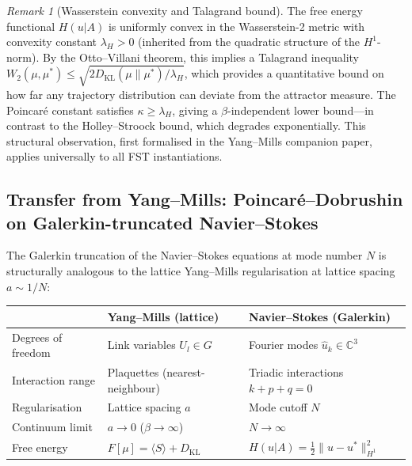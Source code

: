 \documentclass[12pt,a4paper]{article}
\theoremstyle{definition}
\theoremstyle{plain}
\theoremstyle{remark}
\newtheorem{remark}[definition]{Remark}
\begin{document}
\begin{remark}[Wasserstein convexity and Talagrand bound]
\label{rem:talagrand}
The free energy functional $H(u|A)$ is uniformly convex in the Wasserstein-2 metric with convexity constant $\lambda_H > 0$ (inherited from the quadratic structure of the $H^1$-norm). By the Otto--Villani theorem, this implies a Talagrand inequality $W_2(\mu, \mu^*) \leq \sqrt{2 D_{\mathrm{KL}}(\mu \| \mu^*) / \lambda_H}$, which provides a quantitative bound on how far any trajectory distribution can deviate from the attractor measure. The Poincar\'e constant satisfies $\kappa \geq \lambda_H$, giving a $\beta$-independent lower bound---in contrast to the Holley--Stroock bound, which degrades exponentially. This structural observation, first formalised in the Yang--Mills companion paper, applies universally to all FST instantiations.
\end{remark}

\subsection{Transfer from Yang--Mills: Poincar\'e--Dobrushin on Galerkin-truncated Navier--Stokes}
\label{sec:ym-ns-transfer}

The Galerkin truncation of the Navier--Stokes equations at mode number $N$ is structurally analogous to the lattice Yang--Mills regularisation at lattice spacing $a \sim 1/N$:

\begin{center}
\begin{tabular}{l|l|l}
& \textbf{Yang--Mills (lattice)} & \textbf{Navier--Stokes (Galerkin)} \\
\hline
Degrees of freedom & Link variables $U_l \in G$ & Fourier modes $\hat{u}_k \in \mathbb{C}^3$ \\
Interaction range & Plaquettes (nearest-neighbour) & Triadic interactions $k + p + q = 0$ \\
Regularisation & Lattice spacing $a$ & Mode cutoff $N$ \\
Continuum limit & $a \to 0$ ($\beta \to \infty$) & $N \to \infty$ \\
Free energy & $F[\mu] = \langle S \rangle + D_{\mathrm{KL}}$ & $H(u|A) = \frac{1}{2}\|u - u^*\|_{H^1}^2$ \\
\end{tabular}
\end{center}
\end{document}
